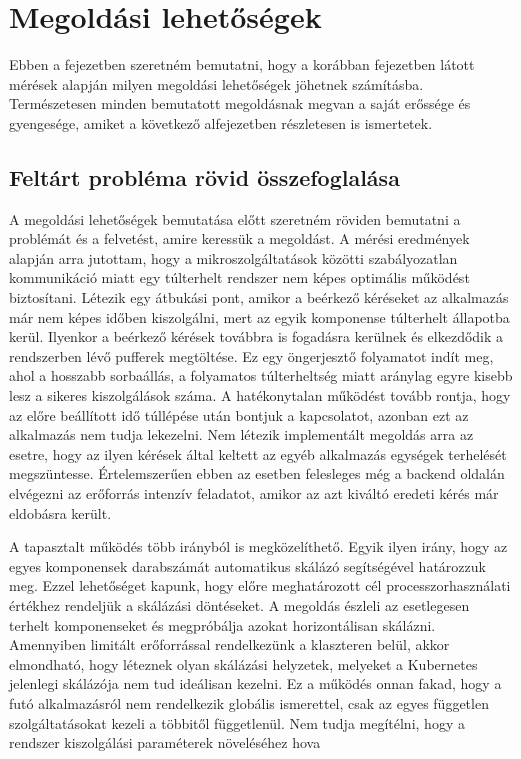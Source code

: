 \chapter{Megoldási lehetőségek}
\label{sec:solutions}

Ebben a fejezetben szeretném bemutatni, hogy a korábban  fejezetben látott mérések alapján milyen megoldási lehetőségek jöhetnek számításba.
Természetesen minden bemutatott megoldásnak megvan a saját erőssége és gyengesége, amiket a következő alfejezetben részletesen is ismertetek.

\section{Feltárt probléma rövid összefoglalása}

A megoldási lehetőségek bemutatása előtt szeretném röviden bemutatni a problémát és a felvetést, amire keressük a megoldást.
A mérési eredmények alapján arra jutottam, hogy a mikroszolgáltatások közötti szabályozatlan kommunikáció miatt egy túlterhelt rendszer nem képes optimális működést biztosítani.
Létezik egy átbukási pont, amikor a beérkező kéréseket az alkalmazás már nem képes időben kiszolgálni, mert az egyik komponense túlterhelt állapotba kerül.
Ilyenkor a beérkező kérések továbbra is fogadásra kerülnek és elkezdődik a rendszerben lévő pufferek megtöltése.
Ez egy öngerjesztő folyamatot indít meg, ahol a hosszabb sorbaállás, a folyamatos túlterheltség miatt aránylag egyre kisebb lesz a sikeres kiszolgálások száma.
A hatékonytalan működést tovább rontja, hogy az előre beállított idő túllépése után bontjuk a kapcsolatot, azonban ezt az alkalmazás nem tudja lekezelni.
Nem létezik implementált megoldás arra az esetre, hogy az ilyen kérések által keltett az egyéb alkalmazás egységek terhelését megszüntesse.
Értelemszerűen ebben az esetben felesleges még a backend oldalán elvégezni az erőforrás intenzív feladatot, amikor az azt kiváltó eredeti kérés már eldobásra került.

A tapasztalt működés több irányból is megközelíthető.
Egyik ilyen irány, hogy az egyes komponensek darabszámát automatikus skálázó segítségével határozzuk meg.
Ezzel lehetőséget kapunk, hogy előre meghatározott cél processzorhasználati értékhez rendeljük a skálázási döntéseket. 
A megoldás észleli az esetlegesen terhelt komponenseket és megpróbálja azokat horizontálisan skálázni.
Amennyiben limitált erőforrással rendelkezünk a klaszteren belül, akkor elmondható, hogy léteznek olyan skálázási helyzetek, melyeket a Kubernetes jelenlegi skálázója nem tud ideálisan kezelni.
Ez a működés onnan fakad, hogy a futó alkalmazásról nem rendelkezik globális ismerettel, csak az egyes független szolgáltatásokat kezeli a többitől függetlenül.
Nem tudja megítélni, hogy a rendszer kiszolgálási paraméterek növeléséhez hova 


